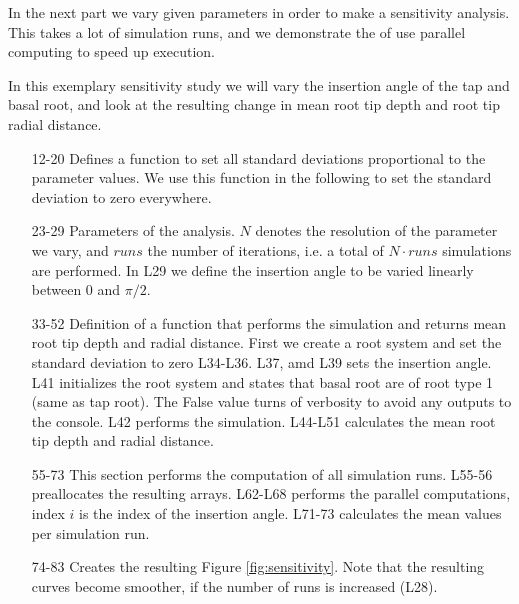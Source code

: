 
In the next part we vary given parameters in order to make a sensitivity analysis. This takes a lot of simulation runs, and we demonstrate the of use parallel computing to speed up execution.

In this exemplary sensitivity study we will vary the insertion angle of the tap and basal root, and look at the resulting change in mean root tip depth and root tip radial distance. 



\begin{itemize}

\item[12-20] Defines a function to set all standard deviations proportional to the parameter values. We use this function in the following to set the standard deviation to zero everywhere. 

\item[23-29] Parameters of the analysis. $N$ denotes the resolution of the parameter we vary, and $runs$ the number of iterations, i.e. a total of $N\cdot runs$ simulations are performed. In L29 we define the insertion angle to be varied linearly between 0 and $\pi/2$.

\item[33-52] Definition of a function that performs the simulation and returns mean root tip depth and radial distance. First we create a root system and set the standard deviation to zero L34-L36. L37, amd L39 sets the insertion angle. L41 initializes the root system and states that basal root are of root type 1 (same as tap root). The False value turns of verbosity to avoid any outputs to the console. L42 performs the simulation. L44-L51 calculates the mean root tip depth and radial distance. 

\item[55-73] This section performs the computation of all simulation runs. L55-56 preallocates the resulting arrays. L62-L68 performs the parallel computations, index $i$ is the index of the insertion angle. L71-73 calculates the mean values per simulation run.

\item[74-83] Creates the resulting Figure \ref{fig:sensitivity}. Note that the resulting curves become smoother, if the number of runs is increased (L28).

\end{itemize}

% 
